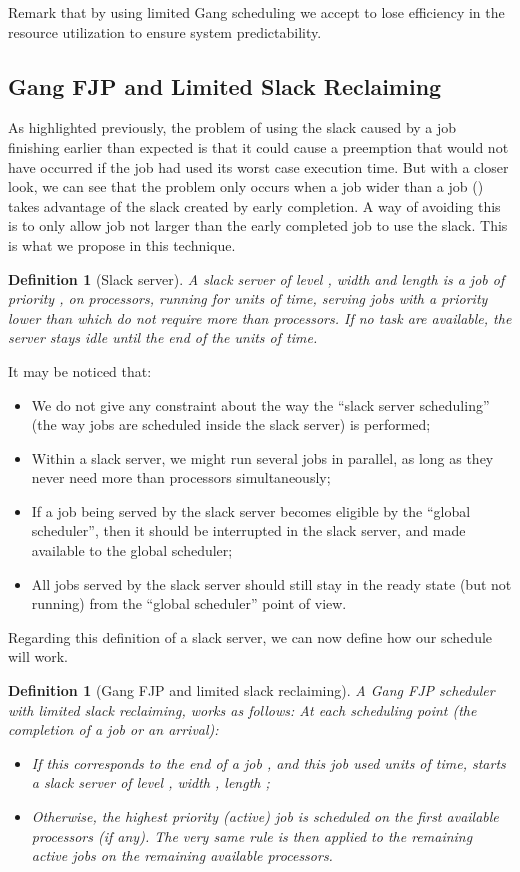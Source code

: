 \documentclass[a4paper]{article}
\newtheorem{definition}[theorem]{Definition}
\begin{document}
Remark that by using limited Gang scheduling we accept to lose efficiency in the resource utilization to ensure system predictability. 
 
\subsection{Gang FJP and Limited Slack Reclaiming}
As highlighted previously, the problem of using the slack caused by a job finishing earlier than expected is that it could cause a preemption that would not have occurred if the job had used its worst case execution time. But with a closer look, we can see that the problem only occurs when a job  wider than a job  () takes advantage of the slack created by  early completion. A way of avoiding this is to only allow job not larger than the early completed job to use the slack. This is what we propose in this technique.

\begin{definition}[Slack server]
A \emph{slack server} of level , width  and length  is a job of priority , on  processors, running for  units of time, serving jobs with a priority lower than  which do not require more than  processors. If no task are available, the server stays idle until the end of the  units of time.
\end{definition}

It may be noticed that:
\begin{itemize}
\item We do not give any constraint about the way the ``slack server scheduling'' (the way jobs are scheduled inside the slack server) is performed;
\item Within a slack server, we might run several jobs in parallel, as long as they never need more than  processors simultaneously;
\item If a job being served by the slack server becomes eligible by the ``global scheduler'', then it should be interrupted in the slack server, and made available to the global scheduler;
\item All jobs served by the slack server should still stay in the ready state (but not running) from the ``global scheduler'' point of view.
\end{itemize}

Regarding this definition of a slack server, we can now define how our schedule will work.

\begin{definition}[Gang FJP and limited slack reclaiming]
A \emph{Gang FJP scheduler with limited slack reclaiming}, works as follows: At each scheduling point (the completion of a job or an arrival):
\begin{itemize}
\item If this corresponds to the end of a job , and this job used  units of time, starts a slack server of level , width , length ;
\item Otherwise, the highest priority (active) job  is scheduled on the first  available processors (if any). The very same rule is then applied to the remaining active jobs on the remaining available processors.
\end{itemize}
\end{definition}
\end{document}
